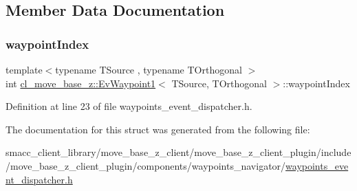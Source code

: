 \subsection{Member Data Documentation}
\mbox{\label{structcl__move__base__z_1_1EvWaypoint1_ae8f88413aec5661bbccfbaa64411f425}} 
\subsubsection{\texorpdfstring{waypoint\+Index}{waypointIndex}}
{\footnotesize\ttfamily template$<$typename T\+Source , typename T\+Orthogonal $>$ \\
int \hyperlink{structcl__move__base__z_1_1EvWaypoint1}{cl\+\_\+move\+\_\+base\+\_\+z\+::\+Ev\+Waypoint1}$<$ T\+Source, T\+Orthogonal $>$\+::waypoint\+Index}



Definition at line 23 of file waypoints\+\_\+event\+\_\+dispatcher.\+h.



The documentation for this struct was generated from the following file\+:\begin{DoxyCompactItemize}
\item 
smacc\+\_\+client\+\_\+library/move\+\_\+base\+\_\+z\+\_\+client/move\+\_\+base\+\_\+z\+\_\+client\+\_\+plugin/include/move\+\_\+base\+\_\+z\+\_\+client\+\_\+plugin/components/waypoints\+\_\+navigator/\hyperlink{waypoints__event__dispatcher_8h}{waypoints\+\_\+event\+\_\+dispatcher.\+h}\end{DoxyCompactItemize}
